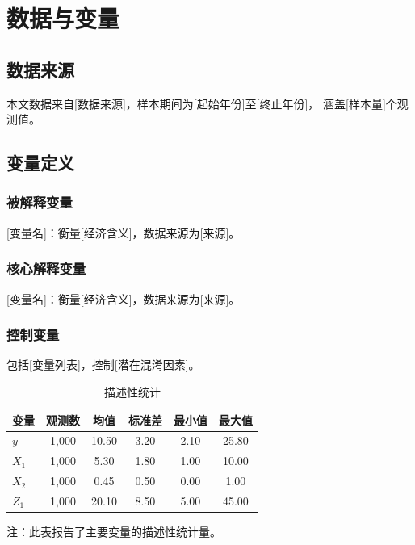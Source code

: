 \documentclass[12pt,a4paper]{article}
\begin{document}
\section{数据与变量}

\subsection{数据来源}

本文数据来自[数据来源]，样本期间为[起始年份]至[终止年份]，
涵盖[样本量]个观测值。

\subsection{变量定义}

\subsubsection{被解释变量}

[变量名]：衡量[经济含义]，数据来源为[来源]。

\subsubsection{核心解释变量}

[变量名]：衡量[经济含义]，数据来源为[来源]。

\subsubsection{控制变量}

包括[变量列表]，控制[潜在混淆因素]。

\begin{table}[htbp]
  \centering
  \caption{描述性统计}
  \label{tab:desc}
  \begin{tabular}{l c c c c c}
    \toprule
    变量 & 观测数 & 均值 & 标准差 & 最小值 & 最大值 \\
    \midrule
    $y$   & 1,000 & 10.50 & 3.20 & 2.10 & 25.80 \\
    $X_1$ & 1,000 &  5.30 & 1.80 & 1.00 & 10.00 \\
    $X_2$ & 1,000 &  0.45 & 0.50 & 0.00 &  1.00 \\
    $Z_1$ & 1,000 & 20.10 & 8.50 & 5.00 & 45.00 \\
    \bottomrule
  \end{tabular}
  \begin{tablenotes}
    \item 注：此表报告了主要变量的描述性统计量。
  \end{tablenotes}
\end{table}
\end{document}
